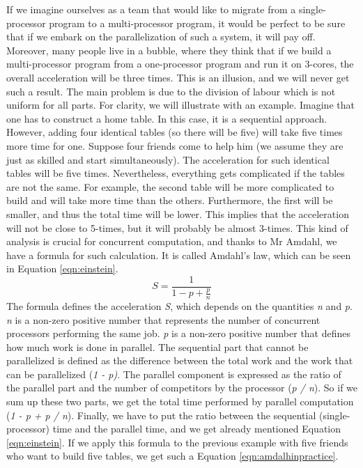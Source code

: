 If we imagine ourselves as a team that would like to migrate from a single-processor program to a multi-processor program, it would be perfect to be sure that if we embark on the parallelization of such a system, it will pay off. Moreover, many people live in a bubble, where they think that if we build a multi-processor program from a one-processor program and run it on 3-cores, the overall acceleration will be three times. This is an illusion, and we will never get such a result. The main problem is due to the division of labour which is not uniform for all parts. For clarity, we will illustrate with an example. Imagine that one has to construct a home table. In this case, it is a sequential approach. However, adding four identical tables (so there will be five) will take five times more time for one. Suppose four friends come to help him (we assume they are just as skilled and start simultaneously). The acceleration for such identical tables will be five times. Nevertheless, everything gets complicated if the tables are not the same. For example, the second table will be more complicated to build and will take more time than the others. Furthermore, the first will be smaller, and thus the total time will be lower. This implies that the acceleration will not be close to 5-times, but it will probably be almost 3-times. This kind of analysis is crucial for concurrent computation, and thanks to Mr Amdahl, we have a formula for such calculation. It is called Amdahl's law, which can be seen in Equation \eqref{eqn:einstein}.
\begin{equation}
    \label{eqn:einstein}
    S = \frac{1}{1 - p + \frac{p}{n}}
    \tag{1}
\end{equation}
The formula defines the acceleration \emph{S}, which depends on the quantities \emph{n} and \emph{p}. \emph{n} is a non-zero positive number that represents the number of concurrent processors performing the same job. \emph{p} is a non-zero positive number that defines how much work is done in parallel. The sequential part that cannot be parallelized is  defined as the difference between the total work and the work that can be parallelized (\emph{1 - p)}. The parallel component is expressed as the ratio of the parallel part and the number of competitors by the processor (\emph{p / n}). So if we sum up these two parts, we get the total time performed by parallel computation (\emph{1 - p + p / n}). Finally, we have to put the ratio between the sequential (single-processor) time and the parallel time, and we get already mentioned Equation \ref{eqn:einstein}. If we apply this formula to the previous example with five friends who want to build five tables, we get such a Equation \eqref{eqn:amdalhinpractice}.

